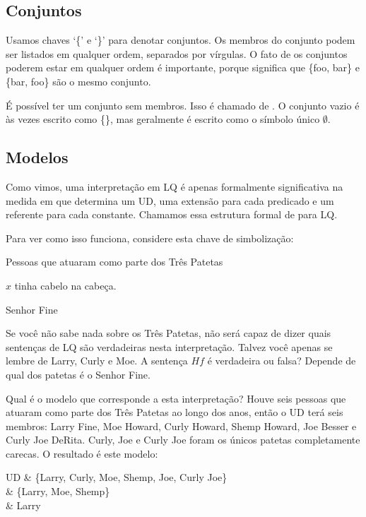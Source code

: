 \subsection{Conjuntos}

Usamos chaves `\{' e `\}' para denotar conjuntos. Os membros do conjunto podem ser listados em qualquer ordem, separados por vírgulas. O fato de os conjuntos poderem estar em qualquer ordem é importante, porque significa que \{foo, bar\} e \{bar, foo\} são o mesmo conjunto.

É possível ter um conjunto sem membros. Isso é chamado de . O conjunto vazio é às vezes escrito como \{\}, mas geralmente é escrito como o símbolo único $\emptyset$.

\subsection{Modelos}
Como vimos, uma interpretação em LQ é apenas formalmente significativa na medida em que determina um UD, uma extensão para cada predicado e um referente para cada constante. Chamamos essa estrutura formal de  para LQ.

Para ver como isso funciona, considere esta chave de simbolização:
\begin{ekey}
\item[UD:] Pessoas que atuaram como parte dos Três Patetas
\item[Hx:] $x$ tinha cabelo na cabeça.
\item[f:] Senhor Fine
\end{ekey}
Se você não sabe nada sobre os Três Patetas, não será capaz de dizer quais sentenças de LQ são verdadeiras nesta interpretação. Talvez você apenas se lembre de Larry, Curly e Moe. A sentença $Hf$ é verdadeira ou falsa? Depende de qual dos patetas é o Senhor Fine.

Qual é o modelo que corresponde a esta interpretação? Houve seis pessoas que atuaram como parte dos Três Patetas ao longo dos anos, então o UD terá seis membros: Larry Fine, Moe Howard, Curly Howard, Shemp Howard, Joe Besser e Curly Joe DeRita. Curly, Joe e Curly Joe foram os únicos patetas completamente carecas. O resultado é este modelo:
\begin{partialmodel}
	UD & \{Larry, Curly, Moe, Shemp, Joe, Curly Joe\}\\
	 & \{Larry, Moe, Shemp\}\\
	 & Larry
\end{partialmodel}

